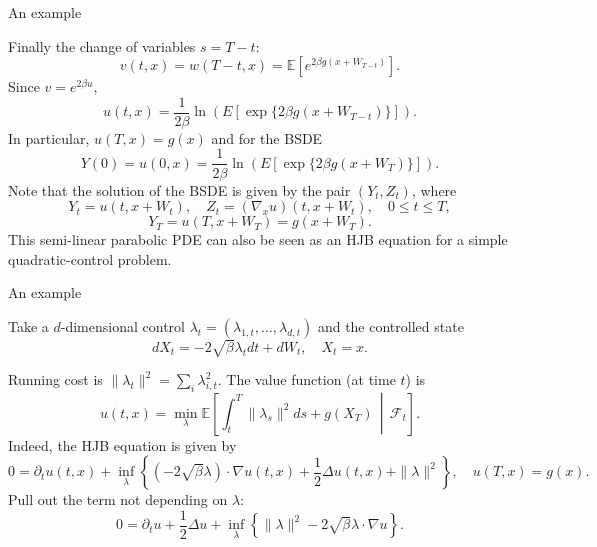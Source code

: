 \documentclass{beamer}
\begin{document}
\begin{frame}{An example}

    {\footnotesize \footnotesize
    Finally the change of variables \( s = T - t \):
  \[
  v(t, x) = w(T - t, x) = \mathbb{E}\left[e^{2\beta g(x+W_{T-t})}\right].
  \]
      \pause Since $v = e^{2\beta u}$,
     \[
    u(t,x) = \frac{1}{2\beta} \ln \left( E\left[ \exp \{ 2\beta g(x + W_{T-t}) \} \right] \right).
    \]
    In particular, \( u(T,x) = g(x) \) and for the BSDE
\[
Y(0) = u(0,x) = \frac{1}{2\beta} \ln \left( E\left[ \exp \{ 2\beta g(x + W_T) \} \right] \right).
\]
    \pause  Note that the solution of the BSDE is given by the pair \((Y_t, Z_t)\), where
\[
Y_t = u(t,x + W_t), \quad Z_t = (\nabla_x u)(t,x + W_t), \quad 0 \leq t \leq T,
\]
\[
Y_T = u(T,x + W_T) = g(x + W_T).
\]
\vspace{1em}
This semi-linear parabolic PDE can also be seen as an HJB equation for a simple quadratic-control problem.

    }
    
\end{frame}

\begin{frame}{An example}

    {\footnotesize \footnotesize
    Take a \( d \)-dimensional control \(\lambda_t = (\lambda_{1,t}, \ldots, \lambda_{d,t})\) and the controlled state
\[
dX_t = -2\sqrt{\beta} \lambda_t dt + dW_t, \quad X_t = x.
\]

Running cost is \(\|\lambda_t\|^2 = \sum_i \lambda_{i,t}^2\). The value function (at time \(t\)) is
\[
u(t, x) = \min_\lambda \mathbb{E} \left[ \int_t^T \|\lambda_s\|^2 ds + g(X_T) \,\middle|\, \mathcal{F}_t \right].
\]
 \pause Indeed, the HJB equation is given by
\[
0 = \partial_t u(t, x) + \inf_\lambda \left\{ (-2\sqrt{\beta} \lambda) \cdot \nabla u(t, x) + \frac{1}{2} \Delta u(t, x) + \|\lambda\|^2 \right\}, \quad u(T, x) = g(x).
\]
Pull out the term not depending on \(\lambda\):
\[
0 = \partial_t u + \frac{1}{2} \Delta u + \inf_\lambda \left\{ \|\lambda\|^2 - 2\sqrt{\beta} \lambda \cdot \nabla u \right\}.
\]
    }
    
\end{frame}
\end{document}
